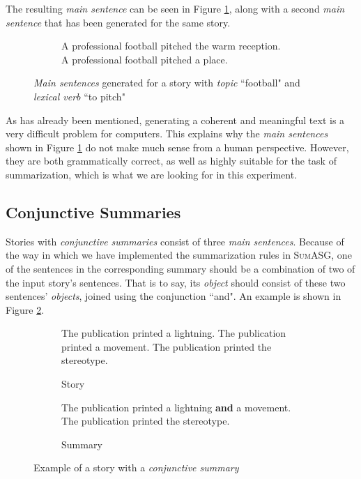 The resulting \textit{main sentence} can be seen in Figure \ref{fig:main_sentences_example}, along with a second \textit{main sentence} that has been generated for the same story.

\begin{figure}[H]
\begin{subfigure}{\textwidth}
\begin{displayquote}
A professional football pitched the warm reception. \\
A professional football pitched a place.
\end{displayquote}
\end{subfigure}
\caption{\textit{Main sentences} generated for a story with \textit{topic} ``football" and \textit{lexical verb} ``to pitch"}
\label{fig:main_sentences_example}
\end{figure}

\noindent
As has already been mentioned, generating a coherent and meaningful text is a very difficult problem for computers. This explains why the \textit{main sentences} shown in Figure \ref{fig:main_sentences_example} do not make much sense from a human perspective. However, they are both grammatically correct, as well as highly suitable for the task of summarization, which is what we are looking for in this experiment.

\subsection{Conjunctive Summaries}

Stories with \textit{conjunctive summaries} consist of three \textit{main sentences}. Because of the way in which we have implemented the summarization rules in \textsc{SumASG}, one of the sentences in the corresponding summary should be a combination of two of the input story's sentences. That is to say, its \textit{object} should consist of these two sentences' \textit{objects}, joined using the conjunction ``and". An example is shown in Figure \ref{fig:conjunctive_summary_example}.

\begin{figure}[H]
\begin{subfigure}{\textwidth}
\begin{displayquote}
The publication printed a lightning. The publication printed a movement. The publication printed the stereotype.
\end{displayquote}
\caption{Story}
\vspace{\baselineskip}
\end{subfigure}
\begin{subfigure}{\textwidth}
\begin{displayquote}
The publication printed a lightning \textbf{and} a movement. The publication printed the stereotype.
\end{displayquote}
\caption{Summary}
\end{subfigure}
\caption{Example of a story with a \textit{conjunctive summary}}
\label{fig:conjunctive_summary_example}
\end{figure}

